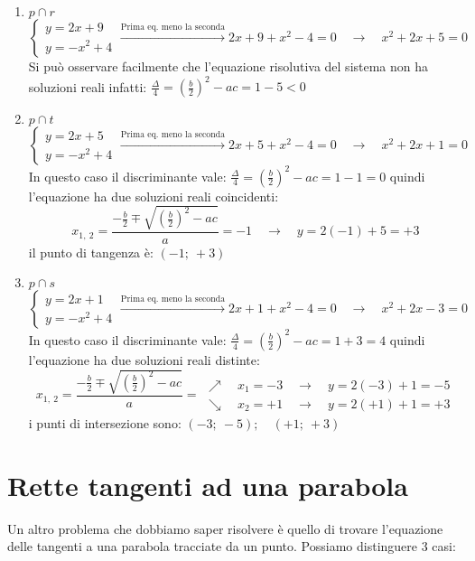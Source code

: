 \begin{enumerate}
 \item \(p \cap r\)
\[\left\{\begin{array}{l}
  y=2x+9\\
  y=-x^2+4
\end{array}\right. \xrightarrow{\text{Prima eq. meno la seconda}}
2x+9+x^2-4=0 \quad \rightarrow \quad x^2+2x+5=0\]
 Si può osservare facilmente che l'equazione risolutiva del sistema non ha 
 soluzioni reali infatti: 
 \(\frac{\Delta}{4}=\left(\frac{b}{2}\right)^2-ac= 1-5 < 0\)
 \item \(p \cap t\)
\[\left\{\begin{array}{l}
  y=2x+5\\
  y=-x^2+4
\end{array}\right. \xrightarrow{\text{Prima eq. meno la seconda}}
2x+5+x^2-4=0 \quad \rightarrow \quad x^2+2x+1=0\]
 In questo caso il discriminante vale: 
 \(\frac{\Delta}{4}=\left(\frac{b}{2}\right)^2-ac= 1-1 = 0\)
 quindi l'equazione ha due soluzioni reali coincidenti:
 \[x_{1,~2}=\frac{-\frac{b}{2} \mp \sqrt{\left(\frac{b}{2}\right)^2-ac}}{a}=
 -1 \quad \rightarrow \quad y=2(-1)+5=+3\]
 il punto di tangenza è: \((-1;~+3)\)
 \item \(p \cap s\)
\[\left\{\begin{array}{l}
  y=2x+1\\
  y=-x^2+4
\end{array}\right. \xrightarrow{\text{Prima eq. meno la seconda}}
2x+1+x^2-4=0 \quad \rightarrow \quad x^2+2x-3=0\]
 In questo caso il discriminante vale: 
 \(\frac{\Delta}{4}=\left(\frac{b}{2}\right)^2-ac= 1+3 = 4\)
 quindi l'equazione ha due soluzioni reali distinte:
 \[x_{1,~2}=\frac{-\frac{b}{2} \mp \sqrt{\left(\frac{b}{2}\right)^2-ac}}{a}=
 \begin{array}{l}
  \nearrow \quad x_1=-3 \quad \rightarrow \quad y=2(-3)+1=-5\\
  \searrow \quad x_2=+1 \quad \rightarrow \quad y=2(+1)+1=+3
 \end{array}\]
 i punti di intersezione sono: \((-3;~-5); \quad (+1;~+3)\)
\end{enumerate}

\section{Rette tangenti ad una parabola}
\label{sec:parabola_altreparabole}

Un altro problema che dobbiamo saper risolvere è quello di trovare l'equazione 
delle tangenti a una parabola tracciate da un punto. Possiamo distinguere 3 casi:

